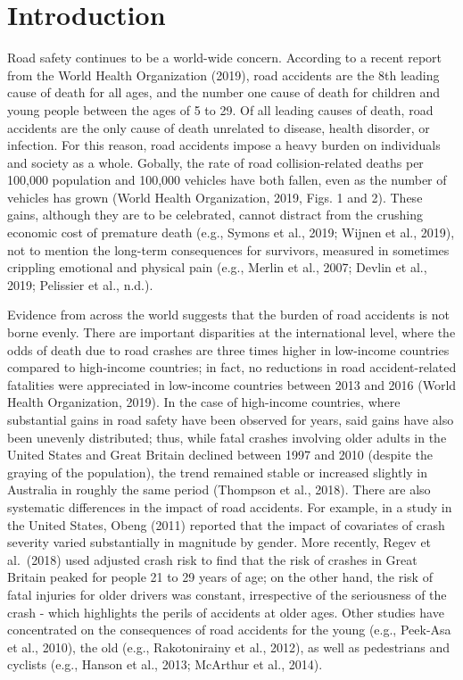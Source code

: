 \documentclass[]{elsarticle} %
\begin{document}
\hypertarget{introduction}{%
\section{Introduction}\label{introduction}}

Road safety continues to be a world-wide concern. According to a recent
report from the World Health Organization (2019), road accidents are the
8th leading cause of death for all ages, and the number one cause of
death for children and young people between the ages of 5 to 29. Of all
leading causes of death, road accidents are the only cause of death
unrelated to disease, health disorder, or infection. For this reason,
road accidents impose a heavy burden on individuals and society as a
whole. Gobally, the rate of road collision-related deaths per 100,000
population and 100,000 vehicles have both fallen, even as the number of
vehicles has grown (World Health Organization, 2019, Figs. 1 and 2).
These gains, although they are to be celebrated, cannot distract from
the crushing economic cost of premature death (e.g., Symons et al.,
2019; Wijnen et al., 2019), not to mention the long-term consequences
for survivors, measured in sometimes crippling emotional and physical
pain (e.g., Merlin et al., 2007; Devlin et al., 2019; Pelissier et al.,
n.d.).

Evidence from across the world suggests that the burden of road
accidents is not borne evenly. There are important disparities at the
international level, where the odds of death due to road crashes are
three times higher in low-income countries compared to high-income
countries; in fact, no reductions in road accident-related fatalities
were appreciated in low-income countries between 2013 and 2016 (World
Health Organization, 2019). In the case of high-income countries, where
substantial gains in road safety have been observed for years, said
gains have also been unevenly distributed; thus, while fatal crashes
involving older adults in the United States and Great Britain declined
between 1997 and 2010 (despite the graying of the population), the trend
remained stable or increased slightly in Australia in roughly the same
period (Thompson et al., 2018). There are also systematic differences in
the impact of road accidents. For example, in a study in the United
States, Obeng (2011) reported that the impact of covariates of crash
severity varied substantially in magnitude by gender. More recently,
Regev et al.~(2018) used adjusted crash risk to find that the risk of
crashes in Great Britain peaked for people 21 to 29 years of age; on the
other hand, the risk of fatal injuries for older drivers was constant,
irrespective of the seriousness of the crash - which highlights the
perils of accidents at older ages. Other studies have concentrated on
the consequences of road accidents for the young (e.g., Peek-Asa et al.,
2010), the old (e.g., Rakotonirainy et al., 2012), as well as
pedestrians and cyclists (e.g., Hanson et al., 2013; McArthur et al.,
2014).
\end{document}
